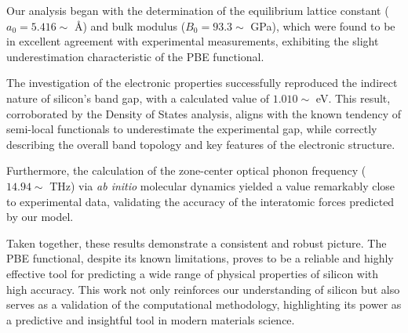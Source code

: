 \documentclass{article}
\begin{document}
Our analysis began with the determination of the equilibrium lattice constant ($a_0 = 5.416\sim$ \AA) and bulk modulus ($B_0 = 93.3\sim$ GPa), which were found to be in excellent agreement with experimental measurements, exhibiting the slight underestimation characteristic of the PBE functional.

The investigation of the electronic properties successfully reproduced the indirect nature of silicon's band gap, with a calculated value of $1.010\sim$ eV. This result, corroborated by the Density of States analysis, aligns with the known tendency of semi-local functionals to underestimate the experimental gap, while correctly describing the overall band topology and key features of the electronic structure.

Furthermore, the calculation of the zone-center optical phonon frequency ($14.94\sim$ THz) via \textit{ab initio} molecular dynamics yielded a value remarkably close to experimental data, validating the accuracy of the interatomic forces predicted by our model.

Taken together, these results demonstrate a consistent and robust picture. The PBE functional, despite its known limitations, proves to be a reliable and highly effective tool for predicting a wide range of physical properties of silicon with high accuracy. This work not only reinforces our understanding of silicon but also serves as a validation of the computational methodology, highlighting its power as a predictive and insightful tool in modern materials science.

\printbibliography %
\end{document}
